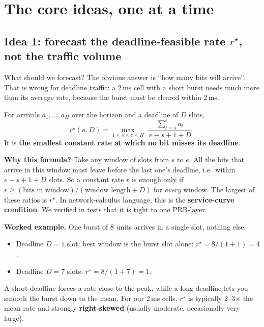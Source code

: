 \documentclass[11pt,a4paper]{article}
\newcommand{\rstar}{r^\star}
\begin{document}
\section{The core ideas, one at a time}

\subsection{Idea 1: forecast the deadline-feasible rate $\rstar$, not the traffic volume}

What should we forecast? The obvious answer is ``how many bits will arrive''. That is wrong for deadline traffic: a 2\,ms cell with a short burst needs much more than its average rate, because the burst must be cleared within 2\,ms.

\begin{idea}
For arrivals $a_1,\dots,a_H$ over the horizon and a deadline of $D$ slots,
\[
  \rstar(a,D) = \max_{1\le s\le e\le H}\ \frac{\sum_{t=s}^{e} a_t}{\,e - s + 1 + D\,}.
\]
It is \textbf{the smallest constant rate at which no bit misses its deadline}.
\end{idea}

\textbf{Why this formula?} Take any window of slots from $s$ to $e$. All the bits that arrive in this window must leave before the last one's deadline, i.e.\ within $e - s + 1 + D$ slots. So a constant rate $r$ is enough only if $r \ge (\text{bits in window})/(\text{window length} + D)$ for \emph{every} window. The largest of these ratios is $\rstar$. In network-calculus language, this is the \textbf{service-curve condition}. We verified in tests that it is tight to one PRB-layer.

\textbf{Worked example.} One burst of 8 units arrives in a single slot, nothing else.
\begin{itemize}
  \item Deadline $D = 1$ slot: best window is the burst slot alone: $\rstar = 8/(1+1) = 4$.
  \item Deadline $D = 7$ slots: $\rstar = 8/(1+7) = 1$.
\end{itemize}
A short deadline forces a rate close to the peak, while a long deadline lets you smooth the burst down to the mean. For our 2\,ms cells, $\rstar$ is typically 2--3$\times$ the mean rate and strongly \textbf{right-skewed} (usually moderate, occasionally very large).
\end{document}
